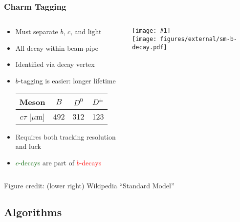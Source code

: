 \documentclass[usenames,dvipsnames]{beamer}
\newcommand{\widegraphic}[1]{\texttt{[image: \#1]}}
\begin{document}
\begin{frame}
  \frametitle{Charm Tagging}
  \begin{columns}
    \begin{column}{0.5\textwidth}
      \begin{itemize}
      \item Must separate $b$, $c$, and light
      \item All decay within beam-pipe
      \item Identified via decay vertex
      \item $b$-tagging is easier: longer lifetime\\
        \begin{center}
          \begin{tabular}{c | c c c}
            Meson  &  $B$ & $D^0$ & $D^{\pm}$ \\ \hline
            $c\tau$ [$\mu$m] & 492 & 312 & 123 \\
          \end{tabular}
        \end{center}
      \item Requires both tracking resolution and luck
      \item \textcolor{darkgreen}{$c$-decays} are part of \textcolor{red}{$b$-decays}
      \end{itemize}
    \end{column}
    \begin{column}{0.4\textwidth}
      \begin{center}
        \widegraphic{figures/external/b-jet.pdf}\\[0.1cm]
        \texttt{[image: figures/external/sm-b-decay.pdf]}
      \end{center}
    \end{column}
  \end{columns}
  \begin{tiny}
    Figure credit: (lower right) Wikipedia ``Standard Model''
  \end{tiny}
\end{frame}

\subsection{Algorithms}
\end{document}
